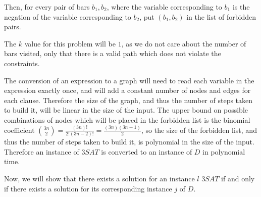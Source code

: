 \documentclass[11pt]{article}
\begin{document}
Then, for every pair of bars $b_1, b_2$, where the variable corresponding to $b_1$ is the negation of the variable corresponding to $b_2$, put $(b_1, b_2)$ in the list of forbidden pairs.

The $k$ value for this problem will be $1$, as we do not care about the number of bars visited, only that there is a valid path which does not violate the constraints.

The conversion of an expression to a graph will need to read each variable in the expression exactly once, and will add a constant number of nodes and edges for each clause. Therefore the size of the graph, and thus the number of steps taken to build it, will be linear in the size of the input. The upper bound on possible combinations of nodes which will be placed in the forbidden list is the binomial coefficient $\binom{3n}{2} = \frac{(3n)!}{2!(3n - 2)!} = \frac{(3n)(3n - 1)}{2}$, so the size of the forbidden list, and thus the number of steps taken to build it, is polynomial in the size of the input. Therefore an instance of $3SAT$ is converted to an instance of $D$ in polynomial time.

Now, we will show that there exists a solution for an instance $l$ $3SAT$ if and only if there exists a solution for its corresponding instance $j$ of $D$. 
\end{document}
